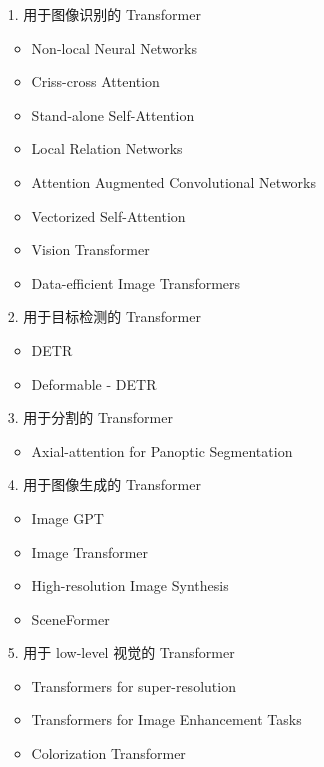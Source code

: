 \begin{itemize}
\item [1.] 用于图像识别的 Transformer

\begin{itemize}
\item Non-local Neural Networks
\item Criss-cross Attention
\item Stand-alone Self-Attention
\item Local Relation Networks
\item Attention Augmented Convolutional Networks
\item Vectorized Self-Attention
\item Vision Transformer
\item Data-efficient Image Transformers
\end{itemize}


\item [2.] 用于目标检测的 Transformer

\begin{itemize}
\item DETR
\item Deformable - DETR
\end{itemize}


\item [3.] 用于分割的 Transformer

\begin{itemize}
\item Axial-attention for Panoptic Segmentation
\end{itemize}


\item [4.] 用于图像生成的 Transformer

\begin{itemize}
\item Image GPT
\item Image Transformer
\item High-resolution Image Synthesis
\item SceneFormer
\end{itemize}


\item [5.] 用于 low-level 视觉的 Transformer

\begin{itemize}
\item Transformers for super-resolution
\item Transformers for Image Enhancement Tasks
\item Colorization Transformer
\end{itemize}



\end{itemize}
